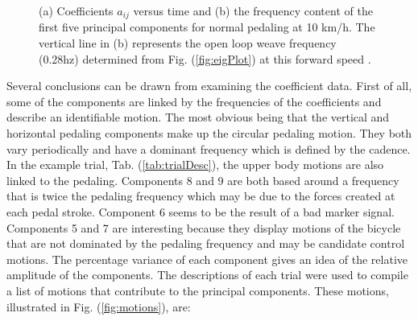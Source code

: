 \begin{figure}[tb]
    \begin{center}
    \end{center}
    \caption{(a) Coefficients $a_{ij}$ versus time and (b) the frequency content of the first five principal components for normal pedaling at 10 km/h. The vertical line in (b) represents the open loop weave frequency (0.28hz) determined from Fig. (\ref{fig:eigPlot}) at this forward speed .}
    \label{fig:3062}
\end{figure}
Several conclusions can be drawn from examining the coefficient data. First of all, some of the components are linked by the frequencies of the coefficients and describe an identifiable motion. The most obvious being that the vertical and horizontal pedaling components make up the circular pedaling motion. They both vary periodically and have a dominant frequency which is defined by the cadence. In the example trial, Tab. (\ref{tab:trialDesc}), the upper body motions are also linked to the pedaling. Components 8 and 9 are both based around a frequency that is twice the pedaling frequency which may be due to the forces created at each pedal stroke. Component 6 seems to be the result of a bad marker signal. Components 5 and 7 are interesting because they display motions of the bicycle that are not dominated by the pedaling frequency and may be candidate control motions. The percentage variance of each component gives an idea of the relative amplitude of the components. The descriptions of each trial were used to compile a list of motions that contribute to the principal components. These motions, illustrated in Fig. (\ref{fig:motions}), are:
